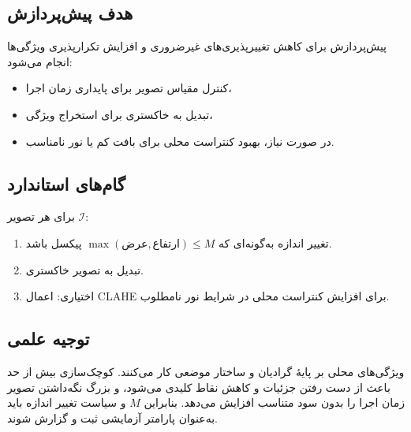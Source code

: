 
\subsection{هدف پیش‌پردازش}
پیش‌پردازش برای کاهش تغییرپذیری‌های غیرضروری و افزایش تکرارپذیری ویژگی‌ها انجام می‌شود:
\begin{itemize}
  \item کنترل مقیاس تصویر برای پایداری زمان اجرا،
  \item تبدیل به خاکستری برای استخراج ویژگی،
  \item در صورت نیاز، بهبود کنتراست محلی برای بافت کم یا نور نامناسب.
\end{itemize}

\subsection{گام‌های استاندارد}
برای هر تصویر $\mathcal{I}$:
\begin{enumerate}
  \item تغییر اندازه به‌گونه‌ای که $\max(\text{عرض},\text{ارتفاع}) \le M$ پیکسل باشد.
  \item تبدیل به تصویر خاکستری.
  \item اختیاری: اعمال CLAHE برای افزایش کنتراست محلی در شرایط نور نامطلوب.
\end{enumerate}

\subsection{توجیه علمی}
ویژگی‌های محلی بر پایهٔ گرادیان و ساختار موضعی کار می‌کنند. کوچک‌سازی بیش از حد باعث از دست رفتن جزئیات و کاهش نقاط کلیدی می‌شود، و بزرگ نگه‌داشتن تصویر زمان اجرا را بدون سود متناسب افزایش می‌دهد. بنابراین $M$ و سیاست تغییر اندازه باید به‌عنوان پارامتر آزمایشی ثبت و گزارش شوند.

